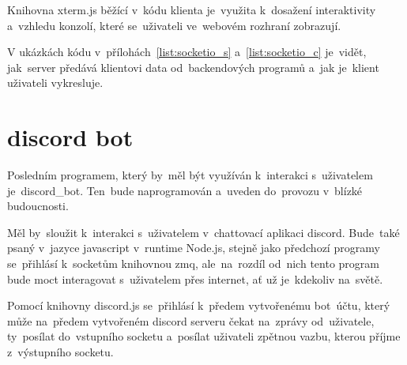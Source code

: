 Knihovna xterm.js běžící v~kódu klienta je~využita k~dosažení interaktivity a~vzhledu konzolí, které se~uživateli ve~webovém rozhraní zobrazují.

V ukázkách kódu v~přílohách~\ref{list:socketio_s} a~\ref{list:socketio_c} je~vidět, jak~server předává klientovi data od~backendových programů a~jak je~klient uživateli vykresluje.



\section{discord bot}

Posledním programem, který by~měl být využíván k~interakci s~uživatelem je~discord\_bot. Ten~bude naprogramován a~uveden do~provozu v~blízké budoucnosti.

Měl by~sloužit k~interakci s~uživatelem v~chattovací aplikaci discord. Bude~také psaný v~jazyce javascript v~runtime Node.js, stejně jako předchozí programy se~přihlásí k~socketům knihovnou zmq, ale~na~rozdíl od~nich tento program bude moct interagovat s~uživatelem přes internet, ať už je~kdekoliv na~světě.

Pomocí knihovny discord.js se~přihlásí k~předem vytvořenému bot~účtu, který může na~předem vytvořeném discord serveru čekat na~zprávy od~uživatele, ty~posílat do~vstupního socketu a~posílat uživateli zpětnou vazbu, kterou příjme z~výstupního socketu.
